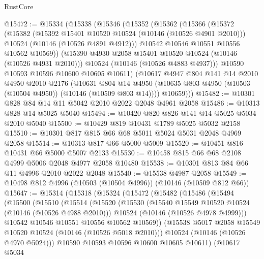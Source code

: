 \begin{lexlean}{RustCore}
\begin{coremodule}
@15472 := @15334
    (@15338
      (@15346
        (@15352
          (@15362
            (@15366
              (@15372
                (@15382
                  (@15392 @15401 @10520 @10524 (@10146 (@10526 @4901 @2010)))
                  @10524
                  (@10146 (@10526 @4891 @4912)))
                @10542
                @10546
                @10551
                @10556
                @10562
                @10569))
            (@15390 @4930 @2058 @15401 @10520 @10524 (@10146 (@10526 @4931 @2010)))
            @10524
            (@10146 (@10526 @4883 @4937)))
          @10590
          @10593
          @10596
          @10600
          @10605
          @10611)
        (@10617
          @4947
          @804
          @141
          @14
          @2010
          @4950
          @2010
          @2176
          (@10631
            @804
            @14
            @4950
            (@10635 @803 @4950 (@10503 (@10504 @4950)) (@10146 (@10509 @803 @14))))
          @10659)))
@15482 := @10301 @828 @84 @14 @11 @5042 @2010 @2022 @2048 @4961 @2058
@15486 := @10313 @828 @14 @5025 @5040
@15494 := @10420 @820 @826 @141 @14 @5025 @5034 @2010 @5040
@15500 := @10429 @819 @10431 @1789 @5025 @5032 @2158
@15510 := @10301 @817 @815 @66 @68 @5011 @5024 @5031 @2048 @4969 @2058
@15514 := @10313 @817 @66 @5000 @5009
@15520 := @10451 @816 @10431 @66 @5000 @5007 @2133
@15530 := @10458 @815 @66 @68 @2108 @4999 @5006 @2048 @4977 @2058 @10480
@15538 := @10301 @813 @84 @66 @11 @4996 @2010 @2022 @2048
@15540 := @15538 @4987 @2058
@15549 := @10498 @812 @4996 (@10503 (@10504 @4996)) (@10146 (@10509 @812 @66))
@15647 := @15314
    (@15318
      (@15324
        (@15472
          (@15482
            (@15486
              (@15494
                (@15500
                  (@15510
                    (@15514
                      (@15520
                        (@15530
                          (@15540 @15549 @10520 @10524 (@10146 (@10526 @4988 @2010)))
                          @10524
                          (@10146 (@10526 @4978 @4999)))
                        @10542
                        @10546
                        @10551
                        @10556
                        @10562
                        @10569))
                    (@15538 @5017 @2058 @15549 @10520 @10524 (@10146 (@10526 @5018 @2010)))
                    @10524
                    (@10146 (@10526 @4970 @5024)))
                  @10590
                  @10593
                  @10596
                  @10600
                  @10605
                  @10611)
                (@10617
                  @5034

\end{coremodule}
\end{lexlean}
